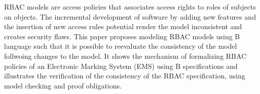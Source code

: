 RBAC models are access policies that associates access rights to roles of subjects on objects. The incremental development of software by adding new features and the insertion of new access rules potential render the model inconsistent and creates security flaws. This paper proposes modeling RBAC models using B language such that it is possible to reevaluate the consistency of the model follwoing changes to the model. It shows the mechanism of formalizing RBAC policies of an Electronic Marking System (EMS) using B specifications and illustrates the verification of the consistency of the RBAC specification, using model checking and proof obligations.